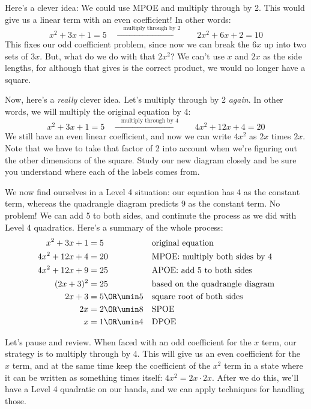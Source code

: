 Here's a clever idea: We could use MPOE and multiply through by 2. This would give us a linear term with an even coefficient! In other words:
\[x^2 + 3x + 1 = 5 \quad\xrightarrow{\quad\text{multiply through by 2}\quad}\quad 2x^2 + 6x + 2 = 10\]
This fixes our odd coefficient problem, since now we can break the $6x$ up into two sets of $3x$. But, what do we do with that $2x^2$? We can't use $x$ and $2x$ as the side lengths, for although that gives is the correct product, we would no longer have a square.


Now, here's a \textit{really} clever idea. Let's multiply through by 2 \textit{again}. In other words, we will multiply the original equation by 4:
\[x^2 + 3x + 1 = 5 \quad\xrightarrow{\quad\text{multiply through by 4}\quad}\quad 4x^2 + 12x + 4 = 20\]
We still have an even linear coefficient, and now we can write $4x^2$ as $2x$ times $2x$. Note that we have to take that factor of 2 into account when we're figuring out the other dimensions of the square. Study our new diagram closely and be sure you understand where each of the labels comes from.
\begin{center}
\end{center}

We now find ourselves in a Level 4 situation: our equation has 4 as the constant term, whereas the quadrangle diagram predicts 9 as the constant term. No problem! We can add 5 to both sides, and continute the process as we did with Level 4 quadratics. Here's a summary of the whole process:
\begin{align*}
x^2 + 3x + 1 &= 5
&&\text{original equation}
\\
4x^2 + 12x + 4 &= 20
&&\text{MPOE: multiply both sides by 4}
\\
4x^2 + 12x + 9 &= 25
&&\text{APOE: add 5 to both sides}
\\
(2x+3)^2 &= 25
&&\text{based on the quadrangle diagram}
\\
2x+3 &= 5 \OR \umin5
&&\text{square root of both sides}
\\
2x &= 2 \OR \umin8
&&\text{SPOE}
\\
x &= 1 \OR \umin4
&&\text{DPOE}
\end{align*}

Let's pause and review. When faced with an odd coefficient for the $x$ term, our strategy is to multiply through by 4. This will give us an even coefficient for the $x$ term, and at the same time keep the coefficient of the $x^2$ term in a state where it can be written as something times itself: $4x^2 = 2x\cdot2x$. After we do this, we'll have a Level 4 quadratic on our hands, and we can apply techniques for handling those.

